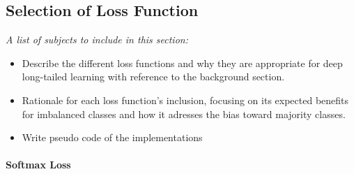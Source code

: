     

\subsection{Selection of Loss Function}
\label{sec:loss_selection}
\textit{A list of subjects to include in this section:}

 \begin{itemize}
    \item Describe the different loss functions and why they are appropriate for deep long-tailed learning with reference to the background section.
    \item Rationale for each loss function's inclusion, focusing on its expected benefits for imbalanced classes and how it adresses the bias toward majority classes.
    \item Write pseudo code of the implementations
 \end{itemize}

 

 \paragraph{Softmax Loss}

